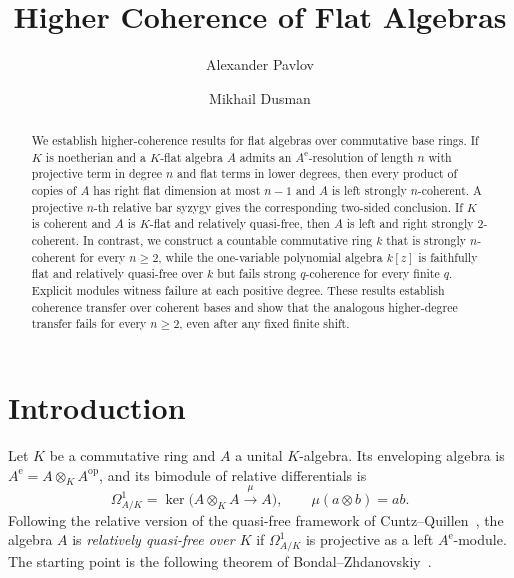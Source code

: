 \documentclass[11pt]{article}
\title{Higher Coherence of Flat Algebras}
\author{Alexander Pavlov \and Mikhail Dusman}
\date{}
\numberwithin{equation}{section}
\theoremstyle{definition}
\theoremstyle{remark}
\begin{document}
\maketitle
\begin{abstract}
We establish higher-coherence results for flat algebras over commutative
base rings.  If $K$ is noetherian and a $K$-flat algebra $A$ admits an
$A^{\mathrm e}$-resolution of length $n$ with projective term in degree
$n$ and flat terms in lower degrees, then every product of copies of
$A$ has right flat dimension at most $n-1$ and $A$ is left strongly
$n$-coherent.  A projective $n$-th relative bar syzygy gives the
corresponding two-sided conclusion.  If $K$ is coherent and $A$ is
$K$-flat and relatively quasi-free, then $A$ is left and right strongly
$2$-coherent.  In contrast, we construct a countable commutative ring
$k$ that is strongly $n$-coherent for every $n\ge2$, while the
one-variable polynomial algebra $k[z]$ is faithfully flat and relatively
quasi-free over $k$ but fails strong $q$-coherence for every finite
$q$.  Explicit modules witness failure at each positive degree.
These results establish coherence transfer over coherent bases and show
that the analogous higher-degree transfer fails for every $n\ge2$,
even after any fixed finite shift.
\end{abstract}
\begingroup
\makeatletter
\renewcommand{\@makefnmark}{}
\makeatother
{}
\endgroup
\section{Introduction}\label{sec:introduction}

Let $K$ be a commutative ring and $A$ a unital $K$-algebra.  Its
enveloping algebra is $A^{\mathrm e}=A\otimes_K A^{\mathrm{op}}$, and
its bimodule of relative differentials is
\[
\Omega^1_{A/K}
=\ker\bigl(A\otimes_K A\xrightarrow{\,\mu\,} A\bigr),
\qquad \mu(a\otimes b)=ab.
\]
Following the relative version of the quasi-free framework of
Cuntz--Quillen~\cite{CuntzQuillen}, the algebra $A$ is
\emph{relatively quasi-free over $K$} if $\Omega^1_{A/K}$ is
projective as a left $A^{\mathrm e}$-module.  The starting point is the
following theorem of Bondal--Zhdanovskiy~\cite{BondalZhdanovskiy}.
\end{document}
